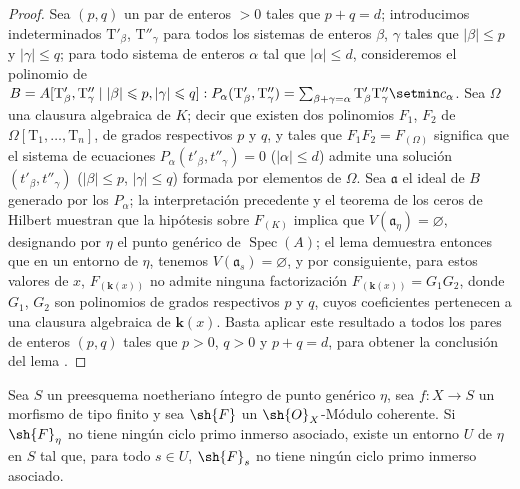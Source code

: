 \begin{proof}
Sea $(p,q)$ un par de enteros $>0$ tales que $p+q=d$; introducimos indeterminados $\mathrm{T}'_\beta$, $\mathrm{T}''_\gamma$ para todos los sistemas de enteros $\beta$, $\gamma$ tales que $|\beta|\leqslant p$ y $|\gamma|\leqslant q$; para todo sistema de enteros $\alpha$ tal que $|\alpha|\leqslant d$, consideremos el polinomio de $B=A[\mathrm{T}'_\beta, \mathrm{T}''_\gamma \mid |\beta|\leqslant p, |\gamma|\leqslant q]: P_\alpha(\mathrm{T}'_\beta,\mathrm{T}''_\gamma)=\sum_{\beta+\gamma=\alpha}\mathrm{T}'_\beta \mathrm{T}''_\gamma\setmin c_\alpha$.
Sea $\Omega$ una clausura algebraica de $K$; decir que existen dos polinomios $F_1$, $F_2$ de $\Omega[\mathrm{T}_1,\ldots,\mathrm{T}_n]$, de grados respectivos $p$ y $q$, y tales que $F_1 F_2=F_{(\Omega)}$ significa que el sistema de ecuaciones $P_\alpha(t'_\beta,t''_\gamma)=0$ ($|\alpha|\leqslant d$) admite una solución $(t'_\beta,t''_\gamma)$ ($|\beta|\leqslant p$, $|\gamma|\leqslant q$) formada por elementos de $\Omega$.
Sea $\mathfrak{a}$ el ideal de $B$ generado por los $P_\alpha$; la interpretación precedente y el teorema de los ceros de Hilbert muestran que la hipótesis sobre $F_{(K)}$ implica que $V(\mathfrak{a}_\eta)=\varnothing$, designando por $\eta$ el punto genérico de $\operatorname{Spec}(A)$; el lema  demuestra entonces que en un entorno de $\eta$, tenemos $V(\mathfrak{a}_s)=\varnothing$, y por consiguiente, para estos valores de $x$, $F_{(\mathbf{k}(x))}$ no admite ninguna factorización $F_{(\mathbf{k}(x))}=G_1 G_2$, donde $G_1$, $G_2$ son polinomios de grados respectivos $p$ y $q$, cuyos coeficientes pertenecen a una clausura algebraica de $\boldsymbol{k}(x)$.
Basta aplicar este resultado a todos los pares de enteros $(p,q)$ tales que $p>0$, $q>0$ y $p+q=d$, para obtener la conclusión del lema .
\end{proof}

\begin{proposition}[9.7.6]
\label{IV.9.7.6}
Sea $S$ un preesquema noetheriano íntegro de punto genérico $\eta$, sea $f:X\to S$ un morfismo de tipo finito y sea $\sh{F}$ un $\sh{O}_X$-Módulo coherente.
Si $\sh{F}_\eta$ no tiene ningún ciclo primo inmerso asociado, existe un entorno $U$ de $\eta$ en $S$ tal que, para todo $s\in U$, $\sh{F}_s$ no tiene ningún ciclo primo inmerso asociado.
\end{proposition}

